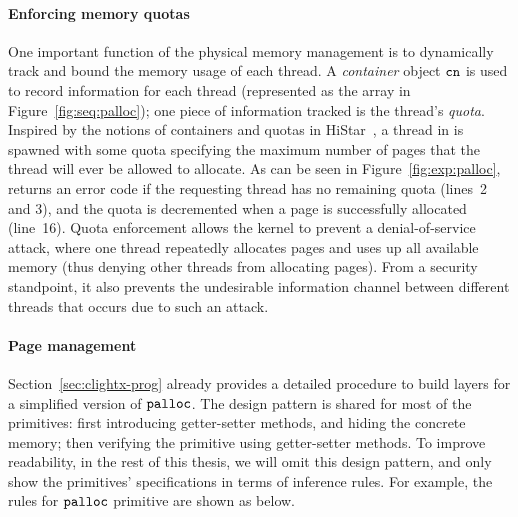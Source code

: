 \paragraph{Enforcing memory quotas}
One important function of the physical memory management is to dynamically
track and bound the memory usage of each thread. A \emph{container}
object ${\texttt{cn}}$ is used to record information for each thread (represented as the array 
in Figure~\ref{fig:seq:palloc}); one piece of information tracked is the
thread's \emph{quota}. Inspired by the notions of containers and
quotas in HiStar~\cite{zeldovich06}, a thread
in {\mCTOS} is spawned with some quota specifying the maximum number
of pages that the thread will ever be allowed to allocate. As can be
seen in Figure~\ref{fig:exp:palloc},  returns an error
code if the requesting thread has no remaining quota (lines~2 and 3), 
and the quota is decremented when a page is successfully allocated (line~16).
Quota enforcement allows the kernel to prevent a denial-of-service attack,
where one thread repeatedly allocates pages and uses up all available
memory (thus denying other threads from allocating pages). From a security
standpoint, it also prevents the undesirable information channel between 
different threads that occurs due to such an attack.

\paragraph{Page management}
Section~\ref{sec:clightx-prog}
already provides
a detailed procedure
to build layers for a simplified version of
${\texttt{palloc}}$.
The design pattern
is shared for most of the primitives:
first introducing getter-setter methods,
and hiding the concrete memory;
then verifying the primitive using
getter-setter methods.
To improve
readability,
in the rest of this thesis,
we will omit
this design pattern,
and only show the primitives' specifications
in terms of inference rules.
For example,
the rules for ${\texttt{palloc}}$ primitive are shown as below.


